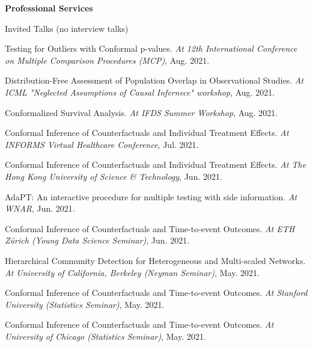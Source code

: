 \documentclass{article}
\begin{document}
\vspace{2mm}
\begin{large}
\noindent \textbf{Professional Services}
\end{large}
\vspace{5mm}

\begin{large}
\noindent Invited Talks (no interview talks)
\end{large}

\vspace{2mm}
Testing for Outliers with Conformal p-values. \emph{At 12th International Conference on Multiple Comparison Procedures (MCP)}, Aug. 2021.

\vspace{2mm}
Distribution-Free Assessment of Population Overlap in Observational Studies. \emph{At ICML "Neglected Assumptions of Causal Infernece" workshop}, Aug. 2021.

\vspace{2mm}
Conformalized Survival Analysis. \emph{At IFDS Summer Workshop}, Aug. 2021.

\vspace{2mm}
Conformal Inference of Counterfactuals and Individual Treatment Effects. \emph{At INFORMS Virtual Healthcare Conference}, Jul. 2021.

\vspace{2mm}
Conformal Inference of Counterfactuals and Individual Treatment Effects. \emph{At The Hong Kong University of Science \& Technology}, Jun. 2021.

\vspace{2mm}
AdaPT: An interactive procedure for multiple testing with side information. \emph{At WNAR}, Jun. 2021.

\vspace{2mm}
Conformal Inference of Counterfactuals and Time-to-event Outcomes. \emph{At ETH Z\"{u}rich (Young Data Science Seminar)}, Jun. 2021.

\vspace{2mm}
Hierarchical Community Detection for Heterogeneous and Multi-scaled Networks. \emph{At University of California, Berkeley (Neyman Seminar)}, May. 2021.

\vspace{2mm}
Conformal Inference of Counterfactuals and Time-to-event Outcomes. \emph{At Stanford University (Statistics Seminar)}, May. 2021.

\vspace{2mm}
Conformal Inference of Counterfactuals and Time-to-event Outcomes. \emph{At University of Chicago (Statistics Seminar)}, May. 2021.
\end{document}
